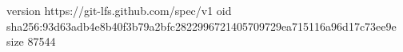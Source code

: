 version https://git-lfs.github.com/spec/v1
oid sha256:93d63adb4e8b40f3b79a2bfc2822996721405709729ea715116a96d17c73ee9e
size 87544
